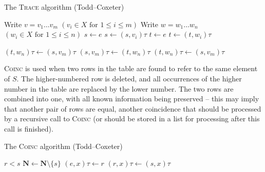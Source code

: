 \begin{algorithm}
\caption{The \textsc{Trace} algorithm (Todd--Coxeter)}
\label{alg:trace}
\begin{algorithmic}[1]
\State Write $v = v_1 \ldots v_m$ \Comment $(v_i \in X \text{~for~} 1 \leq i \leq m)$
\State Write $w = w_1 \ldots w_n$ \Comment $(w_i \in X \text{~for~} 1 \leq i \leq n)$
\State $s \gets e$
    \State {}
  \EndIf
  \State $s \gets (s, v_i)\tau$
\EndFor
\State $t \gets e$
    \State {}
  \EndIf
  \State $t \gets (t, w_i)\tau$
\EndFor

  \State {}
  \State $(t, w_n)\tau \gets (s, v_m)\tau$
  \State $(s, v_m)\tau \gets (t, w_n)\tau$
  \State $(t, w_n)\tau \gets (s, v_m)\tau$
  \State {}
\EndIf

\EndProcedure
\end{algorithmic}
\end{algorithm}

\textsc{Coinc} is used when two rows in the table are found to refer to the same
element of $S$.  The higher-numbered row is deleted, and all occurrences of the
higher number in the table are replaced by the lower number.  The two rows are
combined into one, with all known information being preserved -- this may imply
that another pair of rows are equal, another coincidence that should be
processed by a recursive call to \textsc{Coinc} (or should be stored in a list
for processing after this call is finished).

\begin{algorithm}
\caption{The \textsc{Coinc} algorithm (Todd--Coxeter)}
\label{alg:coinc}
\begin{algorithmic}[1]
\Require $r < s$
\State $\mathbf{N} \gets \mathbf{N} \setminus \{s\}$
      \State $(e, x)\tau \gets r$
    \EndIf
  \EndFor
\EndFor
{}
    \State $(r, x)\tau \gets (s, x)\tau$
    \State {}
  \EndIf
\EndFor
\EndProcedure
\end{algorithmic}
\end{algorithm}

